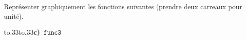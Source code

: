 \documentclass[exercice]{thedocument}%
\begin{document}
%
Représenter graphiquement les fonctions suivantes (prendre deux carreaux pour unité).\par\medskip
\hbox{\hskip20pt\hbox to.33\hbox to.33\linewidth{\bfseries b) $\<func2;$\hfill}\hbox{{\bfseries c) }$\<func3;$\hfill}}
\end{document}
